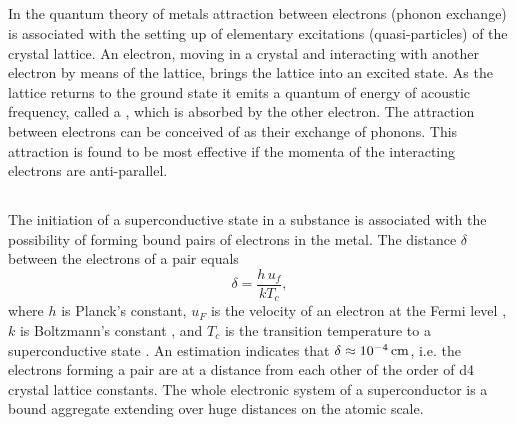 \subsection{}\label{41.6.6} In the quantum theory of metals attraction between electrons (phonon exchange) is associated with the setting up of elementary excitations (quasi-particles) of the crystal lattice. An electron, moving in a crystal and interacting with another electron by means of the lattice, brings the lattice into an excited state. As the lattice returns to the ground state it emits a quantum of energy of acoustic frequency, called a  , which is absorbed by the other electron. The attraction
between electrons can be conceived of as their exchange of
phonons. This attraction is found to be most effective if the
momenta of the interacting electrons are anti-parallel.

\subsection{}\label{41.6.7} The initiation of a superconductive state in a substance is associated with the possibility of forming bound pairs of electrons in the metal. The distance $\delta$ between the electrons of
a pair equals 
\begin{equation*}%
\delta = \frac{h \, u_{f}}{k T_{c}},
\end{equation*}
where $h$ is Planck's constant, $u_{F}$ is the velocity of an electron at the Fermi level , $k$ is Boltzmann's constant , and $T_{c}$ is the transition temperature to a superconductive state
. An estimation indicates that $\delta \approx \SI{d-4}{\centi\meter}$, i.e. the electrons forming a pair are at a distance from each other of the order of \num{d4} crystal lattice constants. The whole electronic system of a superconductor is a bound aggregate extending over huge distances on the atomic scale.

